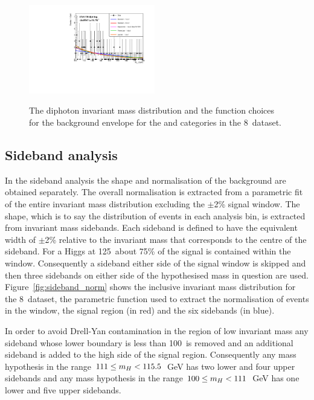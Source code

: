 \begin{figure}
  \includegraphics[width=0.49\textwidth]{analysis/plots/multipdf_plots/cat13_8TeV.pdf}\\
  \caption{The diphoton invariant mass distribution and the function choices for the background envelope for the \VH and \ttH categories in the 8~\TeV dataset.}
  \label{fig:multipdf6}
\end{figure}

\subsection{Sideband analysis}

In the sideband analysis the shape and normalisation of the background are obtained separately. The overall normalisation is extracted from a parametric fit of the entire invariant mass distribution excluding the $\pm$2\% signal window. The shape, which is to say the distribution of events in each analysis bin, is extracted from invariant mass sidebands. Each sideband is defined to have the equivalent width of $\pm$2\% relative to the invariant mass that corresponds to the centre of the sideband. For a \SM Higgs at 125~\GeV about 75\% of the signal is contained within the window. Consequently a sideband either side of the signal window is skipped and then three sidebands on either side of the hypothesised mass in question are used. Figure~\ref{fig:sideband_norm} shows the inclusive invariant mass distribution for the 8~\TeV dataset, the parametric function used to extract the normalisation of events in the window, the signal region (in red) and the six sidebands (in blue).

In order to avoid Drell-Yan contamination in the region of low invariant mass any sideband whose lower boundary is less than 100~\GeV is removed and an additional sideband is added to the high side of the signal region. Consequently any mass hypothesis in the range $111\leq m_{H}< 115.5$~GeV has two lower and four upper sidebands and any mass hypothesis in the range $100\leq m_{H}<111$~GeV has one lower and five upper sidebands.

